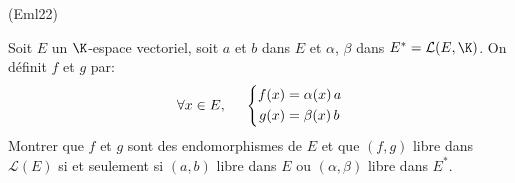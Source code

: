 \begin{tiny}(Eml22)\end{tiny} Soit $E$ un $\K$-espace vectoriel, soit $a$ et $b$ dans $E$ et $\alpha$, $\beta$ dans $E^{*}=\mathcal{L}(E,\K)$. On définit $f$ et $g$ par:
\begin{displaymath}
  \forall x \in E,\hspace{0.5cm}
\left\lbrace 
\begin{aligned}
  f(x) &= \alpha(x)\,a \\ g(x) &= \beta(x)\,b
\end{aligned}
\right. 
\end{displaymath}
Montrer que $f$ et $g$ sont des endomorphismes de $E$ et que $(f,g)$ libre dans $\mathcal{L}(E)$ si et seulement si $(a,b)$ libre dans $E$ ou $(\alpha,\beta)$ libre dans $E^*$.